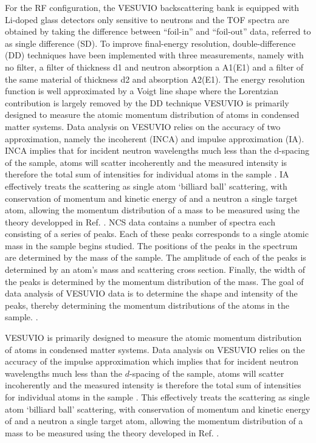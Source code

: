 \documentclass[paper=a4, fontsize=11pt]{scrartcl}	%
\numberwithin{equation}{section}															%
\numberwithin{figure}{section}																%
\numberwithin{table}{section}
\begin{document}
For the RF configuration, the VESUVIO backscattering bank is equipped with Li-doped glass detectors only sensitive to neutrons \cite{seeger1985double} and the TOF spectra are obtained by taking the difference between “foil-in” and “foil-out” data, referred to as single difference (SD). To improve final-energy resolution, double-difference (DD) techniques have been implemented with three measurements, namely with no filter, a filter of thickness d1 and neutron absorption a A1(E1) and a filter of the same material of thickness d2 and absorption A2(E1). The energy resolution function is well approximated by a Voigt line shape where the Lorentzian contribution is largely removed by the DD technique VESUVIO is primarily designed to measure the atomic momentum distribution of atoms in condensed matter systems. Data analysis on VESUVIO relies on the accuracy of two approximation, namely the incoherent (INCA) and impulse approximation (IA). INCA implies that for incident neutron wavelengths much less than the d-spacing of the sample, atoms will scatter incoherently and the measured intensity is
therefore the total sum of intensities for individual atoms in the sample \cite{fernandezalonso2013neutron}. IA effectively treats the scattering as single atom `billiard ball' scattering, with conservation of momentum and kinetic energy of and a neutron a single target atom, allowing the momentum distribution of a mass to be measured using the theory developped in Ref. \cite{mayers2012vesuvio}. NCS data contains a number of spectra each consisting of a series of peaks. Each of these peaks corresponds to a single atomic mass in the sample begins studied. The positions of the peaks in the spectrum are determined by the mass of the sample. The amplitude of each of the peaks is determined by an atom's mass and scattering cross section. Finally, the width of the peaks is determined by the momentum distribution of the mass. The goal of data analysis of VESUVIO data is to determine the shape and intensity of the peaks, thereby determining the momentum distributions of the atoms in the sample. \cite{mayers2010user}.

VESUVIO is primarily designed to measure the atomic momentum distribution of atoms in condensed matter systems. Data analysis on VESUVIO relies on the accuracy of the impulse approximation which implies that for incident neutron wavelengths much less than the $d$-spacing of the sample, atoms will scatter incoherently and the measured intensity is therefore the total sum of intensities for individual atoms in the sample \cite{fernandezalonso2013neutron}. This effectively treats the scattering as single atom `billiard ball' scattering, with conservation of momentum and kinetic energy of and a neutron a single target atom, allowing the momentum distribution of a mass to be measured using the theory developed in Ref. \cite{mayers2004vesuvio}.
\end{document}
